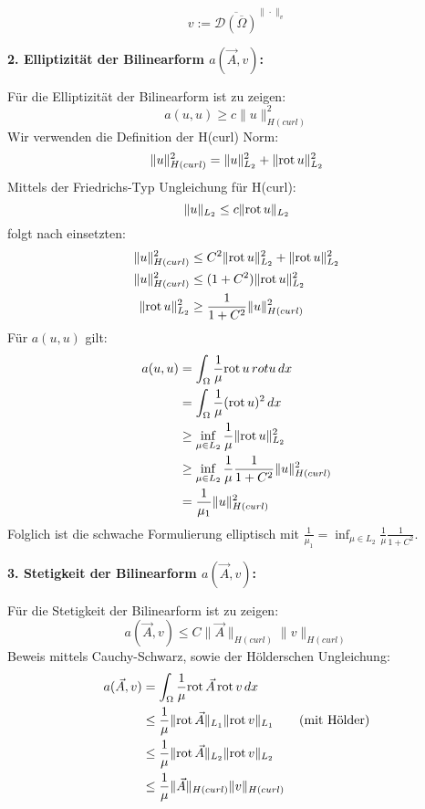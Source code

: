 \begin{equation}
	v := \overline{\mathcal{D}(\overline{\Omega})}^{\| \cdot \|_v}
\end{equation}

\textbf{2. Elliptizit\"at der Bilinearform $a(\vec{A},v)$:}\par
F\"ur die Elliptizit\"at der Bilinearform ist zu zeigen:
\begin{equation}
	a(u,u) \geq c\|u\|^2_{H(curl)}
\end{equation}
Wir verwenden die Definition der H(curl) Norm:
\begin{equation}
	\|u\|^2_{H(curl)} = \|u\|^2_{L_2} + \|\mathrm{rot}\, u\|^2_{L_2}
\end{equation}
Mittels der Friedrichs-Typ Ungleichung f\"ur H(curl):
\begin{equation}
	\|u\|_{L_2} \leq c\|\mathrm{rot}\, u\|_{L_2}
\end{equation}
folgt nach einsetzten:
\begin{align}
	\|u\|^2_{H(curl)} &\leq C^2\|\mathrm{rot}\, u\|^2_{L_2} + \|\mathrm{rot}\, u\|^2_{L_2} \\
	\|u\|^2_{H(curl)} &\leq (1+C^2)\|\mathrm{rot}\, u\|^2_{L_2} \\
	\|\mathrm{rot}\, u\|^2_{L_2} &\geq \frac{1}{1+C^2}\|u\|^2_{H(curl)}\\
\end{align}
F\"ur $a(u,u)$ gilt:
\begin{align}
	a(u,u) &= \int_\Omega \frac{1}{\mu} \mathrm{rot}\, u\,rot u \,dx \\
	 &= \int_\Omega \frac{1}{\mu} (\mathrm{rot}\, u)^2\,dx \\
	 &\geq \inf_{\mu \in L_2} \frac{1}{\mu}\|\mathrm{rot}\, u\|^2_{L_2} \\
	 &\geq \inf_{\mu \in L_2} \frac{1}{\mu}\frac{1}{1+C^2}\|u\|^2_{H(curl)}\\
	 &= \frac{1}{\mu_1}\|u\|^2_{H(curl)}
\end{align}
Folglich ist die schwache Formulierung elliptisch mit $\frac{1}{\mu_1} = \inf_{\mu \in L_2}\frac{1}{\mu}\frac{1}{1+C^2}$.


\newpage


\textbf{3. Stetigkeit der Bilinearform $a(\vec{A},v)$:}\par
F\"ur die Stetigkeit der Bilinearform ist zu zeigen:
\begin{equation}
	a(\vec{A},v) \leq C\|\vec{A}\|_{H(curl)}\|v\|_{H(curl)}
\end{equation}
Beweis mittels Cauchy-Schwarz, sowie der H\"olderschen Ungleichung:
\begin{align}
	a(\vec{A},v) &= \int_\Omega \frac{1}{\mu} \mathrm{rot}\,\vec{A}\,\mathrm{rot}\, v\,dx \\
	 &\leq \frac{1}{\mu}\|\mathrm{rot}\,\vec{A}\|_{L_1}\|\mathrm{rot}\, v\|_{L_1} ~~~~~~\textrm{(mit H\"older)} \\
	 &\leq \frac{1}{\mu}\|\mathrm{rot}\,\vec{A}\|_{L_2}\|\mathrm{rot}\, v\|_{L_2} \\
	 &\leq \frac{1}{\mu}\|\vec{A}\|_{H(curl)}\|v\|_{H(curl)} \\
\end{align}



